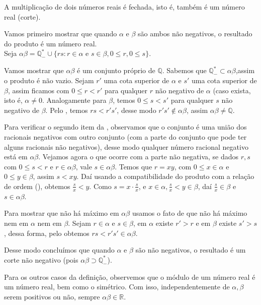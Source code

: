 \documentclass[../main.tex]{subfiles}
\begin{document}
\begin{prop}\label{reais-prop-produtoFechado}
    A multiplicação de dois números reais é fechada, isto é, também é um número real (corte).
\end{prop}
\begin{dem}
    Vamos primeiro mostrar que quando $\alpha$ e $\beta$ são ambos não negativos, o resultado do produto é um número real. \\

    Seja $\alpha \beta = \mathbb{Q}^*_{-} \cup \{ rs : r \in \alpha \text{ e } s \in \beta, 0 \leq r, 0 \leq s \}$.
    
    Vamos mostrar que $\alpha\beta$ é um conjunto próprio de $\mathbb{Q}$. Sabemos que $\mathbb{Q}^*_{-} \subset \alpha \beta$,assim o produto é não vazio. Sejam $r'$ uma cota superior de $\alpha$ e $s'$ uma cota superior de $\beta$, assim ficamos com $0 \leq r < r'$ para qualquer $r$ não negativo de $\alpha$ (caso exista, isto é, $\alpha \neq 0$. Analogamente para $\beta$, temos $0 \leq s < s'$ para qualquer $s$ não negativo de $\beta$. Pelo , temos $rs < r's'$, desse modo $r's' \not\in \alpha \beta$, assim $\alpha \beta \neq \mathbb{Q}$.

    Para verificar o segundo item da , observamos que o conjunto é uma união dos racionais negativos com outro conjunto (com a parte do conjunto que pode ter alguns racionais não negativos), desse modo qualquer número racional negativo está em $\alpha \beta$. Vejamos agora o que ocorre com a parte não negativa, se dados $r,s$ com $0 \leq s < r$ e $r \in \alpha \beta$, vale $s \in \alpha \beta$. Temos que $r = xy$, com $0 \leq x \in \alpha$ e $0 \leq y \in \beta$, assim $s < xy$. Daí usando a compatibilidade do produto com a relação de ordem (), obtemos $\frac{s}{x} < y$. Como $s = x \cdot \frac{s}{x}$, e $x \in \alpha, \frac{s}{x} < y \in \beta$, daí $\frac{s}{x} \in \beta$ e $s \in \alpha \beta$.    

    Para mostrar que não há máximo em $\alpha \beta$ usamos o fato de que não há máximo nem em $\alpha$ nem em $\beta$. Sejam $r \in \alpha$ e $s \in \beta$, em $\alpha$ existe $r' > r$ e em $\beta$ existe $s' > s$, dessa forma, pelo  obtemos $rs < r's'  \in \alpha \beta$.

    Desse modo concluímos que quando $\alpha$ e $\beta$ são não negativos, o resultado é um corte não negativo (pois $\alpha\beta \supset \mathbb{Q}_{-}^*$).

    Para os outros casos da definição, observemos que o módulo de um número real é um número real, bem como o simétrico. Com isso, independentemente de $\alpha, \beta$ serem positivos ou não, sempre $\alpha\beta \in \mathbb{R}$.
\end{dem}
\end{document}
